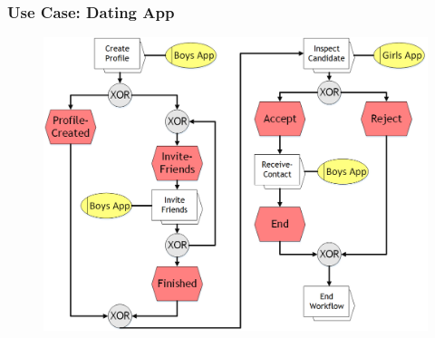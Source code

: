 
\begin{frame}
	\plainnumber
    \frametitle{Use Case: Dating App}
    
    \begin{figure}
    	\includegraphics[width= 0.9\linewidth]{images/DatingApp.png}
    \end{figure}
\end{frame}
